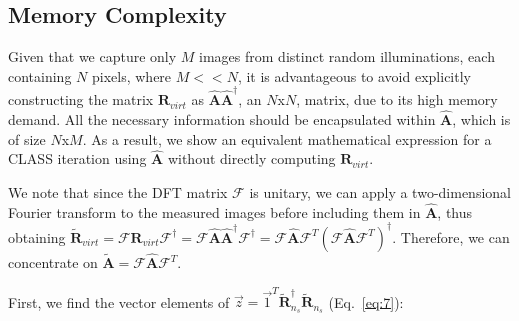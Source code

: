 \documentclass[pdflatex,sn-mathphys-num,Numbered]{sn-jnl}%
\theoremstyle{thmstyleone}%
\theoremstyle{thmstyletwo}%
\theoremstyle{thmstylethree}%
\begin{document}
\subsection*{Memory Complexity}
Given that we capture only $M$ images from distinct random illuminations, each containing $N$ pixels, where $M<<N$, it is advantageous to avoid explicitly constructing the matrix $\textbf{R}_{virt}$ as ${\hat{\textbf{A}}}{\hat{\textbf{A}}}^{\dagger}$, an $N$x$N$, matrix, due to its high memory demand. All the necessary information should be encapsulated within $\hat{\textbf{A}}$, which is of size $N$x$M$. As a result, we show an equivalent mathematical expression for a CLASS iteration using $\hat{\textbf{A}}$ without directly computing $\textbf{R}_{virt}$.

We note that since the DFT matrix \( \mathcal{F} \) is unitary, we can apply a two-dimensional Fourier transform to the measured images before including them in \( {\hat{\textbf{A}}} \), thus obtaining \( \tilde{\textbf{R}}_{virt} = \mathcal{F}\textbf{R}_{virt}\mathcal{F}^{\dagger} = \mathcal{F}{\hat{\textbf{A}}}{\hat{\textbf{A}}}^{\dagger}\mathcal{F}^{\dagger} = \mathcal{F}{\hat{\textbf{A}}}\mathcal{F}^T(\mathcal{F}{\hat{\textbf{A}}}\mathcal{F}^T)^{\dagger} \). Therefore, we can concentrate on $\tilde{\textbf{A}}=\mathcal{F}{\hat{\textbf{A}}}\mathcal{F}^{T}$.

First, we find the vector elements of $\vec{z} = \vec{1}^T\tilde{\textbf{R}}^{\dagger}_{n_s}\tilde{\textbf{R}}_{n_s}$ (Eq.~\ref{eq:7}):
\end{document}
